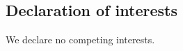 \documentclass[final,1p,times,twocolumn]{elsarticle}
\begin{document}
\subsection{Declaration of interests}
We declare no competing interests.














\end{document}
